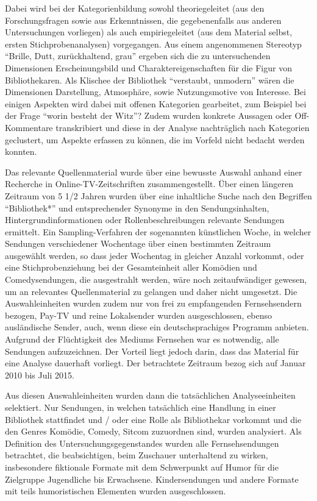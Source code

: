 Dabei wird bei der Kategorienbildung sowohl theoriegeleitet (aus den
Forschungsfragen sowie aus Erkenntnissen, die gegebenenfalls aus anderen
Untersuchungen vorliegen) als auch empiriegeleitet (aus dem Material
selbst, ersten Stichprobenanalysen) vorgegangen. Aus einem angenommenen
Stereotyp \enquote{Brille, Dutt, zurückhaltend, grau} ergeben sich die
zu untersuchenden Dimensionen Erscheinungsbild und
Charaktereigenschaften für die Figur von Bibliothekaren. Als Klischee
der Bibliothek \enquote{verstaubt, unmodern} wären die Dimensionen
Darstellung, Atmosphäre, sowie Nutzungsmotive von Interesse. Bei einigen
Aspekten wird dabei mit offenen Kategorien gearbeitet, zum Beispiel bei
der Frage \enquote{worin besteht der Witz}? Zudem wurden konkrete
Aussagen oder Off-Kommentare transkribiert und diese in der Analyse
nachträglich nach Kategorien geclustert, um Aspekte erfassen zu können,
die im Vorfeld nicht bedacht werden konnten.

Das relevante Quellenmaterial wurde über eine bewusste Auswahl anhand
einer Recherche in Online-TV-Zeitschriften zusammengestellt. Über einen
längeren Zeitraum von 5 1/2 Jahren wurden über eine inhaltliche Suche
nach den Begriffen \enquote{Bibliothek*} und entsprechender Synonyme in
den Sendungsinhalten, Hintergrundinformationen oder Rollenbeschreibungen
relevante Sendungen ermittelt. Ein Sampling-Verfahren der sogenannten
künstlichen Woche, in welcher Sendungen verschiedener Wochentage über
einen bestimmten Zeitraum ausgewählt werden, so dass jeder Wochentag in
gleicher Anzahl vorkommt, oder eine Stichprobenziehung bei der
Gesamteinheit aller Komödien und Comedysendungen, die ausgestrahlt
werden, wäre noch zeitaufwändiger gewesen, um an relevantes
Quellenmaterial zu gelangen und daher nicht umgesetzt. Die
Auswahleinheiten wurden zudem nur von frei zu empfangenden
Fernsehsendern bezogen, Pay-TV und reine Lokalsender wurden
ausgeschlossen, ebenso ausländische Sender, auch, wenn diese ein
deutschsprachiges Programm anbieten. Aufgrund der Flüchtigkeit des
Mediums Fernsehen war es notwendig, alle Sendungen aufzuzeichnen. Der
Vorteil liegt jedoch darin, dass das Material für eine Analyse dauerhaft
vorliegt. Der betrachtete Zeitraum bezog sich auf Januar 2010 bis Juli
2015.

Aus diesen Auswahleinheiten wurden dann die tatsächlichen
Analyseeinheiten selektiert. Nur Sendungen, in welchen tatsächlich eine
Handlung in einer Bibliothek stattfindet und / oder eine Rolle als
Bibliothekar vorkommt und die den Genres Komödie, Comedy, Sitcom
zuzuordnen sind, wurden analysiert. Als Definition des
Untersuchungsgegenstandes wurden alle Fernsehsendungen betrachtet, die
beabsichtigen, beim Zuschauer unterhaltend zu wirken, insbesondere
fiktionale Formate mit dem Schwerpunkt auf Humor für die Zielgruppe
Jugendliche bis Erwachsene. Kindersendungen und andere Formate mit teils
humoristischen Elementen wurden ausgeschlossen.


